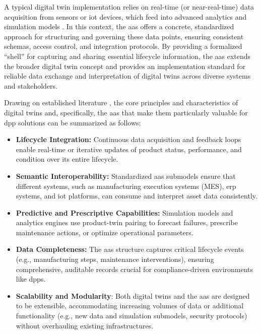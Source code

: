 A typical digital twin implementation relies on real-time (or near-real-time) data acquisition from sensors or \ac{iot} devices, which feed into advanced analytics and simulation models \autocite{Kritzinger.2018}. In this context, the \acrlong{aas} offers a concrete, standardized approach for structuring and governing these data points, ensuring consistent schemas, access control, and integration protocols. By providing a formalized “shell” for capturing and sharing essential lifecycle information, the \ac{aas} extends the broader digital twin concept and provides an implementation standard for reliable data exchange and interpretation of digital twins across diverse systems and stakeholders. \autocite{PlattformIndustrie4.0.2022}

Drawing on established literature \textcite{PlattformIndustrie4.0.2022, Tao.2018b, Grieves.2014}, the core principles and characteristics of digital twins and, specifically, the \ac{aas} that make them particularly valuable for \ac{dpp} solutions can be summarized as follows:

\begin{itemize}[itemsep=0.5\baselineskip]
    \item \textbf{Lifecycle Integration:} Continuous data acquisition and feedback loops enable real-time or iterative updates of product status, performance, and condition over its entire lifecycle. \autocite{Kritzinger.2018}

    \item \textbf{Semantic Interoperability:} Standardized \ac{aas} submodels ensure that different systems, such as manufacturing execution systems (MES), \ac{erp} systems, and \ac{iot} platforms, can consume and interpret asset data consistently. \autocite{PlattformIndustrie4.0.2016, PlattformIndustrie4.0.2022, Bader.2020}

    \item \textbf{Predictive and Prescriptive Capabilities:} Simulation models and analytics engines use product-twin pairing to forecast failures, prescribe maintenance actions, or optimize operational parameters. \autocite{Tao.2018b, Fuller.2020}

    \item \textbf{Data Completeness:} The \ac{aas} structure captures critical lifecycle events (e.g., manufacturing steps, maintenance interventions), ensuring comprehensive, auditable records crucial for compliance-driven environments like \ac{dpp}s. \autocite{PlattformIndustrie4.0.2022}
    
    \item \textbf{Scalability and Modularity}: Both digital twins and the \ac{aas} are designed to be extensible, accommodating increasing volumes of data or additional functionality (e.g., new data and simulation submodels, security protocols) without overhauling existing infrastructures. \autocite{Bader.2020}
\end{itemize}

